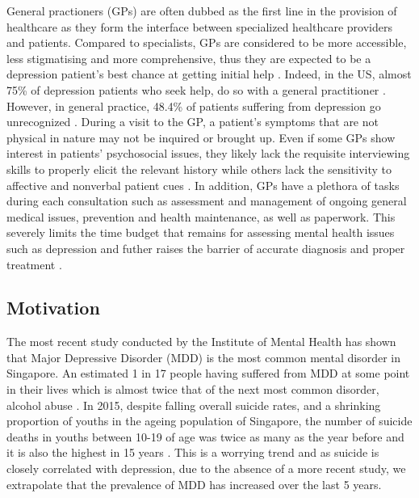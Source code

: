 \documentclass{article}
\begin{document}
	General practioners (GPs) are often dubbed as the first line in the provision of healthcare as they form the interface between specialized healthcare providers and patients. Compared to specialists, GPs are considered to be more accessible, less stigmatising and more comprehensive, thus they are expected to be a depression patient's best chance at getting initial help \cite{rothman2003}. Indeed, in the US, almost 75\% of depression patients who seek help, do so with a general practitioner \cite{goldman1999}. \\ 

	However, in general practice, 48.4\% of patients suffering from depression go unrecognized \cite{jama2003}. During a visit to the GP, a patient's symptoms that are not physical in nature may not be inquired or brought up. Even if some GPs show interest in patients' psychosocial issues, they likely lack the requisite interviewing skills to properly elicit the relevant history while others lack the sensitivity to affective and nonverbal patient cues \cite{badger1994}. In addition, GPs have a plethora of tasks during each consultation such as assessment and management of ongoing general medical issues, prevention and health maintenance, as well as paperwork. This severely limits the time budget that remains for assessing mental health issues such as depression and futher raises the barrier of accurate diagnosis and proper treatment \cite{telford2002}. \\

	\subsection{Motivation}
	The most recent study conducted by the Institute of Mental Health has shown that Major Depressive Disorder (MDD) is the most common mental disorder in Singapore. An estimated 1 in 17 people having suffered from MDD at some point in their lives which is almost twice that of the next most common disorder, alcohol abuse \cite{annacadmedsg}. In 2015, despite falling overall suicide rates, and a shrinking proportion of youths in the ageing population of Singapore, the number of suicide deaths in youths between 10-19 of age was twice as many as the year before and it is also the highest in 15 years \cite{samaritansofsingapore2016}. This is a worrying trend and as suicide is closely correlated with depression, due to the absence of a more recent study, we extrapolate that the prevalence of MDD has increased over the last 5 years. \\
\end{document}
